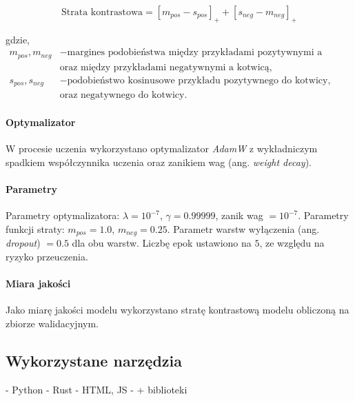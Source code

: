                         \begin{equation}
                            \text{Strata kontrastowa} = [m_{pos} - s_{pos}]_{+} + [s_{neg} - m_{neg}]_{+}
                        \end{equation}
    
                        gdzie,
                        \begin{align*}
                            m_{pos}, m_{neg} &- \text{margines podobieństwa między przykładami pozytywnymi a kotwicą,} \\
                            &\text{oraz między przykładami negatywnymi a kotwicą}, \\
                            s_{pos}, s_{neg} &- \text{podobieństwo kosinusowe przykładu pozytywnego do kotwicy,} \\
                            &\text{oraz negatywnego do kotwicy.}
                        \end{align*}
    
                    \paragraph{Optymalizator}
                    
                        W procesie uczenia wykorzystano optymalizator \textit{AdamW} \cite{Loshchilov2017DecoupledWD} z wykładniczym spadkiem współczynnika uczenia oraz zanikiem wag (ang. \textit{weight decay}).
                
                    \paragraph{Parametry}
    
                         Parametry optymalizatora: $\lambda = 10^{-7}$, $\gamma = 0.99999$, zanik wag $= 10^{-7}$.  Parametry funkcji straty: $m_{pos} = 1.0$, $m_{neg} = 0.25$. Parametr warstw wyłączenia (ang. \textit{dropout}) $= 0.5$ dla obu warstw. Liczbę epok ustawiono na $5$, ze względu na ryzyko przeuczenia.
    
    
                    \paragraph{Miara jakości}
                    
                        Jako miarę jakości modelu wykorzystano stratę kontrastową modelu obliczoną na zbiorze walidacyjnym.

    \subsection{Wykorzystane narzędzia}
    - Python
    - Rust
    - HTML, JS 
    - + biblioteki